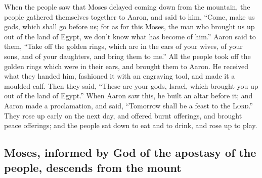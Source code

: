  When the people saw that Moses delayed coming down from
the mountain, the people gathered themselves together to Aaron, and said
to him, ``Come, make us gods, which shall go before us; for as for this
Moses, the man who brought us up out of the land of Egypt, we don't know
what has become of him.''  Aaron said to them, ``Take off
the golden rings, which are in the ears of your wives, of your sons, and
of your daughters, and bring them to me.''  All the people
took off the golden rings which were in their ears, and brought them to
Aaron.  He received what they handed him, fashioned it
with an engraving tool, and made it a moulded calf. Then they said,
``These are your gods, Israel, which brought you up out of the land of
Egypt.''  When Aaron saw this, he built an altar before
it; and Aaron made a proclamation, and said, ``Tomorrow shall be a feast
to the \textsc{Lord}.''  They rose up early on the next
day, and offered burnt offerings, and brought peace offerings; and the
people sat down to eat and to drink, and rose up to play.

\hypertarget{moses-informed-by-god-of-the-apostasy-of-the-people-descends-from-the-mount}{%
\subsection{Moses, informed by God of the apostasy of the people,
descends from the
mount}\label{moses-informed-by-god-of-the-apostasy-of-the-people-descends-from-the-mount}}

